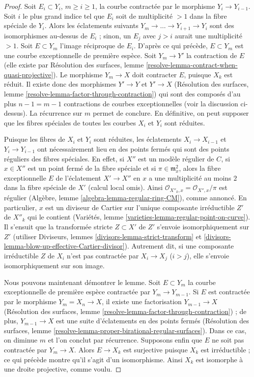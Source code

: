 \begin{proof}
\medskip\noindent
Soit $E_i \subset Y_i$, $m \geq i \geq 1$, la courbe contractée par le
morphisme $Y_i \to Y_{i-1}$. Soit $i$ le plus grand indice tel que $E_i$
soit de multiplicité $>1$ dans la fibre spéciale de $Y_i$. Alors les
éclatements suivants $Y_m \to \ldots \to Y_{i+1} \to Y_i$ sont des
isomorphismes au-dessus de $E_i$ ; sinon, un $E_j$ avec $j>i$ aurait une
multiplicité $>1$. Soit $E \subset Y_m$ l'image réciproque de $E_i$.
D'après ce qui précède, $E \subset Y_m$ est une courbe exceptionnelle de
première espèce. Soit $Y_m \to Y'$ la contraction de $E$ (elle existe par
Résolution des surfaces, lemme
\ref{resolve-lemma-contract-when-quasi-projective}). Le morphisme
$Y_m \to X$ doit contracter $E$, puisque $X_k$ est réduit. Il existe donc
des morphismes $Y' \to Y$ et $Y' \to X$ (Résolution des surfaces, lemme
\ref{resolve-lemma-factor-through-contraction}) qui sont des composés d'au
plus $n-1=m-1$ contractions de courbes exceptionnelles (voir la discussion
ci-dessus). La récurrence sur $m$ permet de conclure. En définitive, on peut
supposer que les fibres spéciales de toutes les courbes $X_i$ et $Y_i$ sont
réduites.

\medskip\noindent
Puisque les fibres de $X_i$ et $Y_i$ sont réduites, les éclatements
$X_i \to X_{i-1}$ et $Y_i \to Y_{i-1}$ ont nécessairement lieu en des
points fermés qui sont des points réguliers des fibres spéciales.
En effet, si $X''$ est un modèle régulier de $C$, si $x \in X''$ est un
point fermé de la fibre spéciale et si $\pi \in \mathfrak m_x^2$, alors la
fibre exceptionnelle $E$ de l'éclatement $X' \to X''$ en $x$ a une
multiplicité au moins $2$ dans la fibre spéciale de $X'$ (calcul local
omis). Ainsi
$\mathcal{O}_{X''_k,x}=\mathcal{O}_{X'',x}/\pi$ est régulier (Algèbre,
lemme \ref{algebra-lemma-regular-ring-CM}), comme annoncé. En particulier,
$x$ est un diviseur de Cartier sur l'unique composante irréductible
$Z'$ de $X''_k$ qui le contient (Variétés, lemme
\ref{varieties-lemma-regular-point-on-curve}). Il s'ensuit que la
transformée stricte $Z \subset X'$ de $Z'$ s'envoie isomorphiquement sur
$Z'$ (utiliser Diviseurs, lemmes \ref{divisors-lemma-strict-transform} et
\ref{divisors-lemma-blow-up-effective-Cartier-divisor}). Autrement dit, si
une composante irréductible $Z$ de $X_i$ n'est pas contractée par
$X_i \to X_j$ ($i>j$), elle s'envoie isomorphiquement sur son image.

\medskip\noindent
Nous pouvons maintenant démontrer le lemme. Soit $E \subset Y_m$ la courbe
exceptionnelle de première espèce contractée par $Y_m \to Y_{m-1}$.
Si $E$ est contractée par le morphisme $Y_m=X_n \to X$, il existe une
factorisation $Y_{m-1} \to X$ (Résolution des surfaces, lemme
\ref{resolve-lemma-factor-through-contraction}) ; de plus,
$Y_{m-1} \to X$ est une suite d'éclatements en des points fermés
(Résolution des surfaces, lemme
\ref{resolve-lemma-proper-birational-regular-surfaces}). Dans ce cas, on
diminue $m$ et l'on conclut par récurrence. Supposons enfin que $E$ ne soit
pas contractée par $Y_m \to X$. Alors $E \to X_k$ est surjective puisque
$X_k$ est irréductible ; ce qui précède montre qu'il s'agit d'un
isomorphisme. Ainsi $X_k$ est isomorphe à une droite projective, comme
voulu.
\end{proof}
